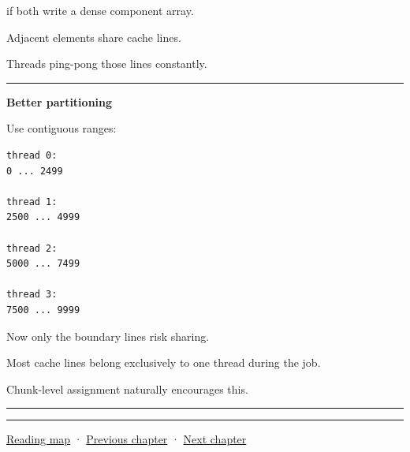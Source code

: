if both write a dense component array.

Adjacent elements share cache lines.

Threads ping-pong those lines constantly.

\begin{center}\rule{0.5\linewidth}{0.5pt}\end{center}

\textbf{Better partitioning}

Use contiguous ranges:

\begin{verbatim}
thread 0:
0 ... 2499

thread 1:
2500 ... 4999

thread 2:
5000 ... 7499

thread 3:
7500 ... 9999
\end{verbatim}

Now only the boundary lines risk sharing.

Most cache lines belong exclusively to one thread during the job.

Chunk-level assignment naturally encourages this.

\begin{center}\rule{0.5\linewidth}{0.5pt}\end{center}

\begin{center}\rule{0.5\linewidth}{0.5pt}\end{center}

\hyperref[volume-reading-map]{Reading map} · \hyperref[05-engine-i-ch015-sparse-set-components-and-generational-entity-handles]{Previous chapter} · \hyperref[05-engine-i-ch017-ecs-performance-through-cache-and-scheduling]{Next chapter}
